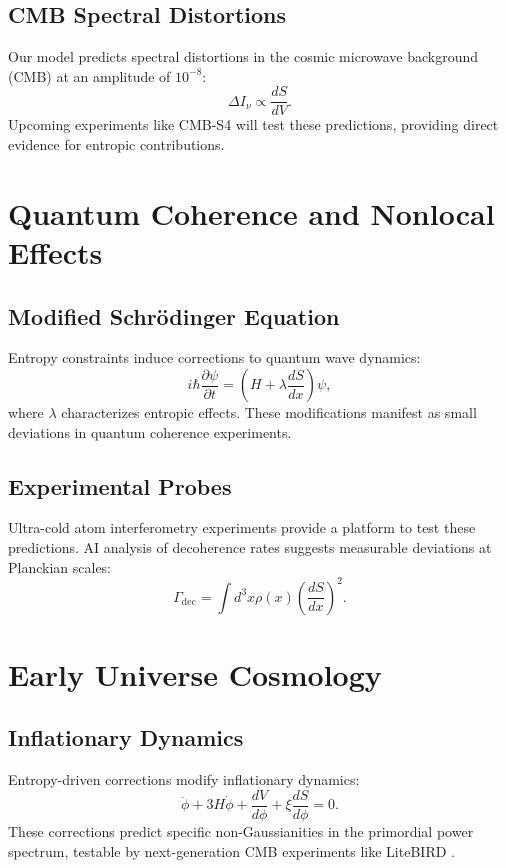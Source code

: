 \documentclass[12pt]{article}
\begin{document}
\subsection{CMB Spectral Distortions}
Our model predicts spectral distortions in the cosmic microwave background (CMB) at an amplitude of $10^{-8}$:
\begin{equation}
\Delta I_\nu \propto \frac{dS}{dV}.
\end{equation}
Upcoming experiments like CMB-S4 \cite{CMB-S42023} will test these predictions, providing direct evidence for entropic contributions.

\section{Quantum Coherence and Nonlocal Effects}
\subsection{Modified Schrödinger Equation}
Entropy constraints induce corrections to quantum wave dynamics:
\begin{equation}
i \hbar \frac{\partial \psi}{\partial t} = \left(H + \lambda \frac{dS}{dx}\right) \psi,
\end{equation}
where $\lambda$ characterizes entropic effects. These modifications manifest as small deviations in quantum coherence experiments.

\subsection{Experimental Probes}
Ultra-cold atom interferometry experiments \cite{Kasevich2023} provide a platform to test these predictions. AI analysis of decoherence rates suggests measurable deviations at Planckian scales:
\begin{equation}
\Gamma_{\text{dec}} = \int d^3x \rho(x) \left(\frac{dS}{dx}\right)^2.
\end{equation}

\section{Early Universe Cosmology}
\subsection{Inflationary Dynamics}
Entropy-driven corrections modify inflationary dynamics:
\begin{equation}
\ddot{\phi} + 3H \dot{\phi} + \frac{dV}{d\phi} + \xi \frac{dS}{d\phi} = 0.
\end{equation}
These corrections predict specific non-Gaussianities in the primordial power spectrum, testable by next-generation CMB experiments like LiteBIRD \cite{LiteBIRD2023}.
\end{document}
